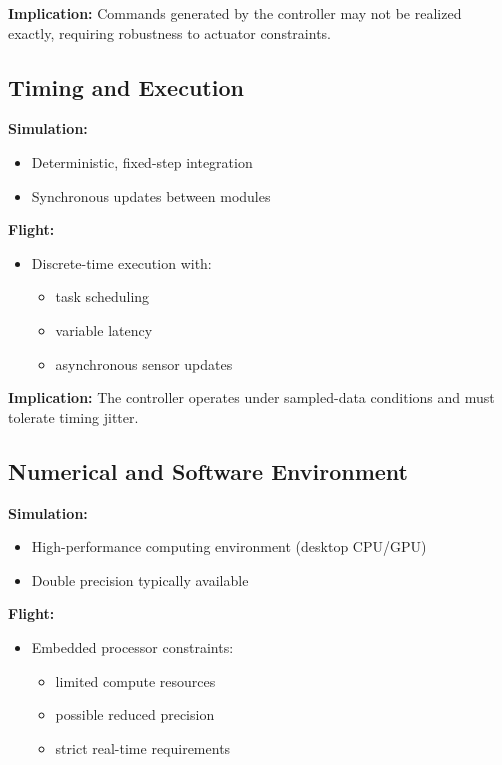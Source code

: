 \textbf{Implication:}  
Commands generated by the controller may not be realized exactly, requiring robustness to actuator constraints.

\subsection{Timing and Execution}

\textbf{Simulation:}
\begin{itemize}
	\item Deterministic, fixed-step integration
	\item Synchronous updates between modules
\end{itemize}

\textbf{Flight:}
\begin{itemize}
	\item Discrete-time execution with:
	\begin{itemize}
		\item task scheduling
		\item variable latency
		\item asynchronous sensor updates
	\end{itemize}
\end{itemize}

\textbf{Implication:}  
The controller operates under sampled-data conditions and must tolerate timing jitter.

\subsection{Numerical and Software Environment}

\textbf{Simulation:}
\begin{itemize}
	\item High-performance computing environment (desktop CPU/GPU)
	\item Double precision typically available
\end{itemize}

\textbf{Flight:}
\begin{itemize}
	\item Embedded processor constraints:
	\begin{itemize}
		\item limited compute resources
		\item possible reduced precision
		\item strict real-time requirements
	\end{itemize}
\end{itemize}

